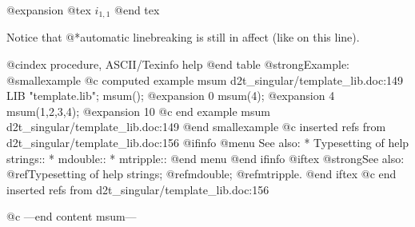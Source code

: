 @expansion{}
@tex
$i_{1,1}$
@end tex


Notice that
@*automatic linebreaking is still in affect (like on this line).

@cindex procedure, ASCII/Texinfo help
@end table
@strong{Example:}
@smallexample
@c computed example msum d2t_singular/template_lib.doc:149 
LIB "template.lib";
msum();
@expansion{} 0
msum(4);
@expansion{} 4
msum(1,2,3,4);
@expansion{} 10
@c end example msum d2t_singular/template_lib.doc:149
@end smallexample
@c inserted refs from d2t_singular/template_lib.doc:156
@ifinfo
@menu
See also:
* Typesetting of help strings::
* mdouble::
* mtripple::
@end menu
@end ifinfo
@iftex
@strong{See also:}
@ref{Typesetting of help strings};
@ref{mdouble};
@ref{mtripple}.
@end iftex
@c end inserted refs from d2t_singular/template_lib.doc:156

@c ---end content msum---
